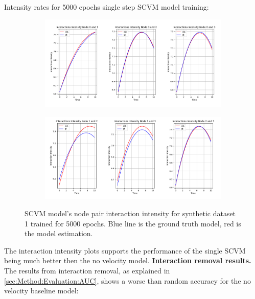 \clearpage
\noindent
Intensity rates for 5000 epochs single step SCVM model training:
\begin{figure}[H]
    \centering
    \begin{subfigure}[b]{\textwidth}
        \centering
        \includegraphics[width=\textwidth]{0_images/rq1_SCVM_intensity_plot1.png}
    \end{subfigure}
    \vfill
    \begin{subfigure}[b]{\textwidth}
        \centering
        \includegraphics[width=\textwidth]{0_images/rq1_SCVM_intensity_plot2.png}
    \end{subfigure}
    \caption{SCVM model's node pair interaction intensity for synthetic dataset 1 trained for 5000 epochs. Blue line is the ground truth model, red is the model estimation.}
    \label{fig:RQ1:SCVM_intensity}
\end{figure}
\noindent
The interaction intensity plots supports the performance of the single SCVM being much better then the no velocity model.
\clearpage
\vspace*{-2cm}
\noindent
\textbf{Interaction removal results.}
\\
The results from interaction removal, as explained in \ref{sec:Method:Evaluation:AUC}, shows a worse than random accuracy for the no velocity baseline model:

